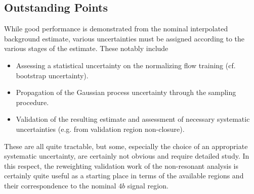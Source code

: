 \subsection{Outstanding Points}
While good performance is demonstrated from the nominal interpolated background estimate, various 
uncertainties must be assigned according to the various stages of the estimate. These notably include
\begin{itemize}
	\item Assessing a statistical uncertainty on the normalizing flow training (cf. bootstrap uncertainty).
	\item Propagation of the Gaussian process uncertainty through the sampling procedure.
	\item Validation of the resulting estimate and assessment of necessary systematic uncertainties (e.g. from 
	validation region non-closure).
\end{itemize}
These are all quite tractable, but some, especially the choice of an appropriate systematic uncertainty, 
are certainly not obvious and require detailed study. In this respect, the reweighting validation work of the 
non-resonant analysis is certainly quite useful as a starting place in terms of the available regions 
and their correspondence to the nominal $4b$ signal region.


